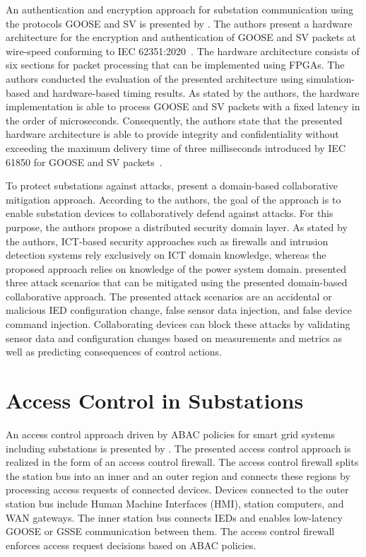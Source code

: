 An authentication and encryption approach for substation communication using the protocols GOOSE and SV is presented by \citeauthor{Rodriguez2021} \cite{Rodriguez2021}.
The authors present a hardware architecture for the encryption and authentication of GOOSE and SV packets at wire-speed conforming to IEC 62351:2020~\cite{IEC62351P6}.
The hardware architecture consists of six sections for packet processing that can be implemented using FPGAs.
The authors conducted the evaluation of the presented architecture using simulation-based and hardware-based timing results.
As stated by the authors, the hardware implementation is able to process GOOSE and SV packets with a fixed latency in the order of microseconds.
Consequently, the authors state that the presented hardware architecture is able to provide integrity and confidentiality without exceeding the maximum delivery time of three milliseconds introduced by IEC 61850 for GOOSE and SV packets~\cite{IEC61850P5}.

To protect substations against attacks, \citeauthor{Hong2019} \cite{Hong2019} present a domain-based collaborative mitigation approach.
According to the authors, the goal of the approach is to enable substation devices to collaboratively defend against attacks.
For this purpose, the authors propose a distributed security domain layer.
As stated by the authors, ICT-based security approaches such as firewalls and intrusion detection systems rely exclusively on ICT domain knowledge, whereas the proposed approach relies on knowledge of the power system domain.
\citeauthor{Hong2019} presented three attack scenarios that can be mitigated using the presented domain-based collaborative approach.
The presented attack scenarios are an accidental or malicious IED configuration change, false sensor data injection, and false device command injection.
Collaborating devices can block these attacks by validating sensor data and configuration changes based on measurements and metrics as well as predicting consequences of control actions.

\section{Access Control in Substations}
An access control approach driven by ABAC policies for smart grid systems including substations is presented by \citeauthor{Ruland2018} \cite{Ruland2018}.
The presented access control approach is realized in the form of an access control firewall.
The access control firewall splits the station bus into an inner and an outer region and connects these regions by processing access requests of connected devices.
Devices connected to the outer station bus include Human Machine Interfaces (HMI), station computers, and WAN gateways.
The inner station bus connects IEDs and enables low-latency GOOSE or GSSE communication between them.
The access control firewall enforces access request decisions based on ABAC policies.

